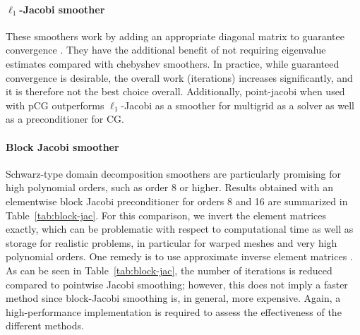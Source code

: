 \documentclass[times]{nlaauth}
\begin{document}
\paragraph{$\ell_1$-Jacobi smoother} These smoothers work by adding an appropriate diagonal matrix
to guarantee convergence \cite{BakerFalgoutKolevEtAl11}. They have the additional benefit of not requiring eigenvalue estimates 
compared with chebyshev smoothers. In practice, while guaranteed convergence is desirable, the overall
work (iterations) increases significantly, and it is therefore not the best choice overall. Additionally, 
point-jacobi when used with pCG outperforms $\ell_1$-Jacobi as a smoother for multigrid as a solver as well as
a preconditioner for CG.

\paragraph{Block Jacobi smoother}
Schwarz-type domain decomposition smoothers are particularly promising
for high polynomial orders, such as order 8 or higher. Results
obtained with an elementwise block Jacobi preconditioner for orders 8
and 16 are summarized in Table~\ref{tab:block-jac}. For this
comparison, we invert the element matrices exactly, which can be
problematic with respect to computational time as well as storage for
realistic problems, in particular for warped meshes and very high
polynomial orders. One remedy is to use approximate inverse element
matrices \cite{LottesFischer05}. As can be seen in
Table~\ref{tab:block-jac}, the
number of iterations is reduced compared to pointwise Jacobi
smoothing; however, this does not imply a faster method since
block-Jacobi smoothing is, in general, more expensive. Again, a
high-performance implementation is required to assess the
effectiveness of the different methods.
\end{document}
